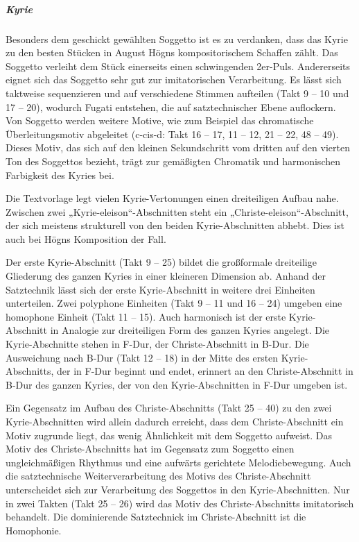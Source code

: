 \documentclass[a4paper]{article}
\begin{document}
\subparagraph{Kyrie}
Besonders dem geschickt gewählten Soggetto ist es zu verdanken, dass das
Kyrie zu den besten Stücken in August Högns kompositorischem Schaffen
zählt. Das Soggetto verleiht dem Stück einerseits einen schwingenden
2er-Puls. Andererseits eignet sich das Soggetto sehr gut zur
imitatorischen Verarbeitung. Es lässt sich taktweise sequenzieren und
auf verschiedene Stimmen aufteilen (Takt 9 – 10 und 17 – 20), wodurch
Fugati entstehen, die auf satztechnischer Ebene auflockern. Von
Soggetto werden weitere Motive, wie zum Beispiel das chromatische
Überleitungsmotiv abgeleitet (c-cis-d: Takt 16 – 17, 11 – 12, 21 – 22,
48 – 49). Dieses Motiv, das sich auf den kleinen Sekundschritt vom
dritten auf den vierten Ton des Soggettos bezieht, trägt zur gemäßigten
Chromatik und harmonischen Farbigkeit des Kyries bei.

Die Textvorlage legt vielen Kyrie-Vertonungen einen dreiteiligen Aufbau
nahe. Zwischen zwei „Kyrie-eleison“-Abschnitten steht ein
„Christe-eleison“-Abschnitt, der sich meistens strukturell von den
beiden Kyrie-Abschnitten abhebt. Dies ist auch bei Högns Komposition
der Fall. 

Der erste Kyrie-Abschnitt (Takt 9 – 25) bildet die großformale
dreiteilige Gliederung des ganzen Kyries in einer kleineren Dimension
ab. Anhand der Satztechnik lässt sich der erste Kyrie-Abschnitt in
weitere drei Einheiten unterteilen. Zwei polyphone Einheiten (Takt 9 –
11 und 16 – 24) umgeben eine homophone Einheit (Takt 11 – 15). Auch
harmonisch ist der erste Kyrie-Abschnitt in Analogie zur dreiteiligen
Form des ganzen Kyries angelegt. Die Kyrie-Abschnitte stehen in F-Dur,
der Christe-Abschnitt in B-Dur. Die Ausweichung nach B-Dur (Takt 12 –
18) in der Mitte des ersten Kyrie-Abschnitts, der in F-Dur beginnt und
endet, erinnert an den Christe-Abschnitt in B-Dur des ganzen Kyries,
der von den Kyrie-Abschnitten in F-Dur umgeben ist.

Ein Gegensatz im Aufbau des Christe-Abschnitts (Takt 25 – 40) zu den
zwei Kyrie-Abschnitten wird allein dadurch erreicht, dass dem
Christe-Abschnitt ein Motiv zugrunde liegt, das wenig Ähnlichkeit mit
dem Soggetto aufweist. Das Motiv des Christe-Abschnitts hat im
Gegensatz zum Soggetto einen ungleichmäßigen Rhythmus und eine aufwärts
gerichtete Melodiebewegung. Auch die satztechnische Weiterverarbeitung
des Motivs des Christe-Abschnitt unterscheidet sich zur Verarbeitung
des Soggettos in den Kyrie-Abschnitten. Nur in zwei Takten (Takt 25 –
26) wird das Motiv des Christe-Abschnitts imitatorisch behandelt. Die
dominierende Satztechnick im Christe-Abschnitt ist die Homophonie. 
\end{document}
